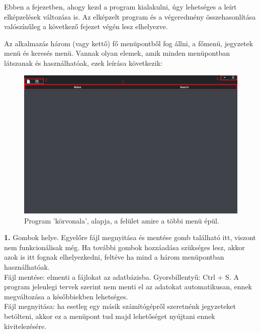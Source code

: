 

Ebben a fejezetben, ahogy kezd a program kialakulni, úgy lehetséges a leírt elképzelések változása is. Az elképzelt program és a végeredmény összehasonlítása valószínűleg a következő fejezet végén lesz elhelyezve.

Az alkalmazás három (vagy kettő) fő menüpontből fog állni, a főmenü, jegyzetek menü és keresés menü. Vannak olyan elemek, amik minden menüpontban látszanak és használhatóak, ezek leírása következik:

\begin{figure}[h]
	\centering
	\includegraphics[scale=0.7]{images/menu_1.png}
	\caption{Program 'körvonala', alapja, a felület amire a többi menü épül.}
	\label{fig:main_foundation}
\end{figure}

\noindent \textbf{1.} Gombok helye. Egyelőre fájl megnyitása és mentése gomb található itt, viszont nem funkcionálisak még. Ha további gombok hozzáadása szükséges lesz, akkor azok is itt fognak elhelyezkedni, feltéve ha mind a három menüpontban használhatóak.
\vspace{5pt} \\Fájl mentése: elmenti a fájlokat az adatbázisba. Gyorsbillentyű: Ctrl + S. A program jelenlegi tervek szerint nem menti el az adatokat automatikusan, ennek megváltozása a későbbiekben lehetséges.
\vspace{5pt} \\Fájl megnyitása: ha esetleg egy másik számítógépről szeretnénk jegyzeteket betölteni, akkor ez a menüpont tud majd lehetőséget nyújtani ennek kivitelezésére.\vspace{5pt}

